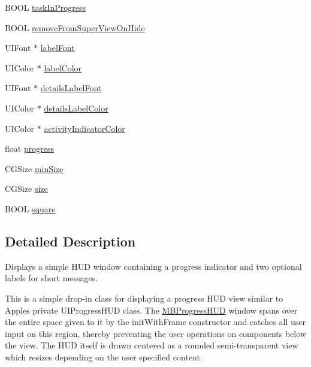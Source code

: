\begin{DoxyCompactItemize}
\item 
B\+O\+OL \mbox{\hyperlink{interface_m_b_progress_h_u_d_a6077ea42c37c18b3058ed63ac10ede8f}{task\+In\+Progress}}
\item 
B\+O\+OL \mbox{\hyperlink{interface_m_b_progress_h_u_d_a36639aa18a70f2734942695c32ec5e91}{remove\+From\+Super\+View\+On\+Hide}}
\item 
U\+I\+Font $\ast$ \mbox{\hyperlink{interface_m_b_progress_h_u_d_a85b03f18b8313f4c3efc2002ad79ff27}{label\+Font}}
\item 
U\+I\+Color $\ast$ \mbox{\hyperlink{interface_m_b_progress_h_u_d_a9c84b50c6e30381e1ce0d9ea6cb504db}{label\+Color}}
\item 
U\+I\+Font $\ast$ \mbox{\hyperlink{interface_m_b_progress_h_u_d_af3a772e02286bf867c2b4c2213be0180}{details\+Label\+Font}}
\item 
U\+I\+Color $\ast$ \mbox{\hyperlink{interface_m_b_progress_h_u_d_a2542723377f9b99a7c9682bedb802a36}{details\+Label\+Color}}
\item 
U\+I\+Color $\ast$ \mbox{\hyperlink{interface_m_b_progress_h_u_d_a3805497e26ca24a42eaf68d55ea02f70}{activity\+Indicator\+Color}}
\item 
float \mbox{\hyperlink{interface_m_b_progress_h_u_d_a4c8328617d11efd1f5452032246ca97f}{progress}}
\item 
C\+G\+Size \mbox{\hyperlink{interface_m_b_progress_h_u_d_a69c6b2cad533d6fe7d90df02bf7f8b0c}{min\+Size}}
\item 
C\+G\+Size \mbox{\hyperlink{interface_m_b_progress_h_u_d_a0c987a2e4026910e21167e95fee7b4e4}{size}}
\item 
B\+O\+OL \mbox{\hyperlink{interface_m_b_progress_h_u_d_a4bf7271b213e304259aa7d97f7cb1849}{square}}
\end{DoxyCompactItemize}


\subsection{Detailed Description}
Displays a simple H\+UD window containing a progress indicator and two optional labels for short messages.

This is a simple drop-\/in class for displaying a progress H\+UD view similar to Apple\textquotesingle{}s private U\+I\+Progress\+H\+UD class. The \mbox{\hyperlink{interface_m_b_progress_h_u_d}{M\+B\+Progress\+H\+UD}} window spans over the entire space given to it by the init\+With\+Frame constructor and catches all user input on this region, thereby preventing the user operations on components below the view. The H\+UD itself is drawn centered as a rounded semi-\/transparent view which resizes depending on the user specified content.

